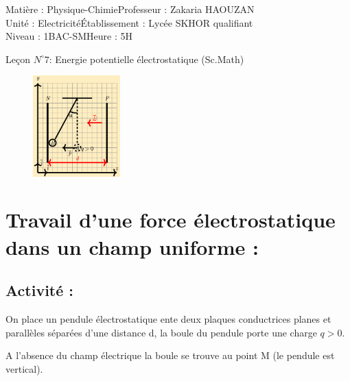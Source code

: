 \documentclass[12pt]{article}
\author{Zakaria HAOUZAN}
\date{\today}
\newcommand\headerMe[2]{\noindent{}#1\hfill#2}
\begin{document}
\headerMe{Matière : Physique-Chimie}{Professeur : Zakaria HAOUZAN}\\
\headerMe{Unité : Electricité}{Établissement : Lycée SKHOR qualifiant}\\
\headerMe{Niveau : 1BAC-SM}{Heure : 5H}\\

\begin{center}

    \Large{Leçon $N^{\circ} 7 $: \color{red} Energie potentielle électrostatique (Sc.Math) }
\end{center}


\begin{figure}
  \vspace{-1cm}
    \includegraphics[width=0.3\textwidth]{./img/img_00.png}
\end{figure}


\section{Travail d’une force électrostatique dans un champ uniforme :}
\subsection{ Activité :}
On place un pendule électrostatique ente deux plaques conductrices planes et parallèles séparées d'une distance d, la boule du
pendule porte une charge $q>0$.

A l’absence du champ électrique la boule se trouve au point M (le pendule est vertical).
\end{document}
